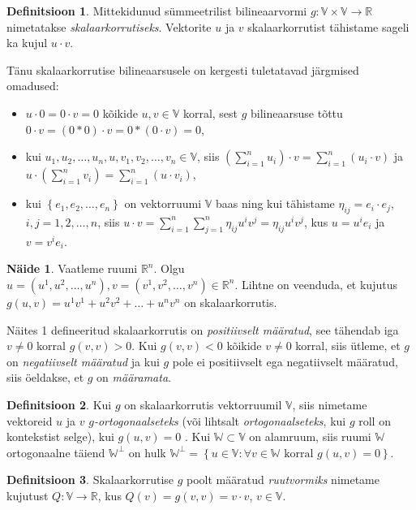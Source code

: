 \documentclass[a4paper,12pt]{article}
\theoremstyle{plain}
\theoremstyle{definition}
\newtheorem{definitsioon}{Definitsioon}[section]
\newtheorem{naide}{Näide}[section]
\numberwithin{equation}{section}
\begin{document}
\begin{definitsioon}
Mittekidunud sümmeetrilist bilineaarvormi $g: \mathbb{V} \times \mathbb{V} \rightarrow \mathbb{R}$ nimetatakse \emph{skalaarkorrutiseks}. Vektorite $u$ ja $v$ skalaarkorrutist tähistame sageli ka kujul $u \cdot v$.
\end{definitsioon}

Tänu skalaarkorrutise bilineaarsusele on kergesti tuletatavad järgmised omadused:
\begin{itemize}
\item $u \cdot 0 = 0 \cdot v = 0$ kõikide $u, v \in \mathbb{V}$ korral, sest $g$ bilineaarsuse tõttu $0 \cdot v = \left(0*0\right) \cdot v = 0*\left(0 \cdot v \right) = 0$,
\item kui $u_1, u_2, \dots, u_n, u, v_1, v_2, \dots, v_n \in \mathbb{V}$, siis $\left( \sum_{i = 1}^{n} u_i \right) \cdot v = \sum_{i = 1}^{n}  \left( u_i \cdot v \right)$ ja $u \cdot \left( \sum_{i = 1}^{n} v_i \right) = \sum_{i = 1}^{n}  \left( u \cdot v_i \right)$,
\item kui $\left\lbrace e_1, e_2, \dots, e_n \right\rbrace$ on vektorruumi $\mathbb{V}$ baas ning kui tähistame $\eta_{ij} = e_i \cdot e_j$, $i,j = 1, 2, \dots, n$, siis $u \cdot v = \sum_{i = 1}^{n} \sum_{j = 1}^{n} \eta_{ij} u^i v^j = \eta_{ij} u^i v^j$, kus $u = u^i e_i$ ja $v = v^i e_i$.
\end{itemize}

\begin{naide}
Vaatleme ruumi $\mathbb{R}^{n}$. Olgu $u = \left(u^1, u^2, \dots, u^n \right), v = \left(v^1, v^2, \dots, v^n \right) \in \mathbb{R}^{n}$. Lihtne on veenduda, et kujutus $g \left(u, v \right) = u^1v^1 + u^2v^2 + \dots + u^n v^n$ on skalaarkorrutis.
\end{naide}

Näites 1 defineeritud skalaarkorrutis on \emph{positiivselt määratud}, see tähendab iga $v \neq 0$ korral $g \left(v, v \right) > 0$. Kui $g \left(v, v \right) < 0$ kõikide $v \neq 0$ korral, siis ütleme, et $g$ on \emph{negatiivselt määratud} ja kui $g$ pole ei positiivselt ega negatiivselt määratud, siis öeldakse, et $g$ on \emph{määramata}.

\begin{definitsioon}
Kui $g$ on skalaarkorrutis vektorruumil $\mathbb{V}$, siis nimetame vektoreid $u$ ja $v$ \emph{$g$-ortogonaalseteks} (või lihtsalt \emph{ortogonaalseteks}, kui $g$ roll on kontekstist selge), kui $g \left( u, v \right) = 0$ . Kui $\mathbb{W} \subset \mathbb{V}$ on alamruum, siis ruumi $\mathbb{W}$ ortogonaalne täiend $\mathbb{W}^{\perp}$ on hulk $\mathbb{W}^{\perp} = \left\lbrace u \in \mathbb{V} : \forall v \in  \mathbb{W} \text{ korral } g \left(u, v \right) = 0 \right\rbrace$.
\end{definitsioon}
\begin{definitsioon}
Skalaarkorrutise $g$ poolt määratud \emph{ruutvormiks} nimetame kujutust $Q : \mathbb{V} \rightarrow \mathbb{R}$, kus $Q \left( v \right) = g\left(v, v\right) = v \cdot v$, $v \in \mathbb{V}$.
\end{definitsioon}
\end{document}
